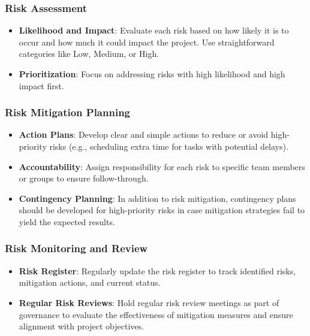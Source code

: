 \documentclass[a4paper,12pt]{article}
\begin{document}
\subsubsection*{Risk Assessment}
\begin{itemize}[left=1em, itemsep=0pt, topsep=0pt] 
     \item \textbf{Likelihood and Impact}: Evaluate each risk based on how likely it is to occur and how much it could impact the project. Use straightforward categories like Low, Medium, or High.
    \item \textbf{Prioritization}: Focus on addressing risks with high likelihood and high impact first.
\end{itemize}

\subsubsection*{Risk Mitigation Planning}
\begin{itemize}[left=1em, itemsep=0pt, topsep=0pt] 
   \item \textbf{Action Plans}: Develop clear and simple actions to reduce or avoid high-priority risks (e.g., scheduling extra time for tasks with potential delays).
    \item \textbf{Accountability}: Assign responsibility for each risk to specific team members or groups to ensure follow-through.
    \item \textbf{Contingency Planning}: In addition to risk mitigation, contingency plans should be developed for high-priority risks in case mitigation strategies fail to yield the expected results.
\end{itemize}

\subsubsection*{Risk Monitoring and Review}
\begin{itemize}[left=1em, itemsep=0pt, topsep=0pt] 
     \item \textbf{Risk Register}: Regularly update the risk register to track identified risks, mitigation actions, and current status.
    \item \textbf{Regular Risk Reviews}: Hold regular risk review meetings as part of governance to evaluate the effectiveness of mitigation measures and ensure alignment with project objectives.
\end{itemize}
\end{document}
